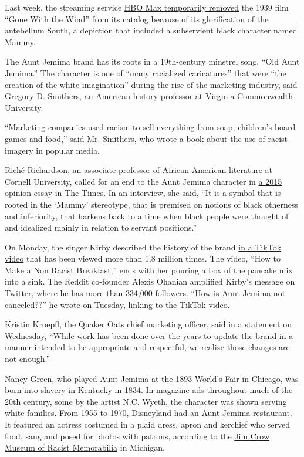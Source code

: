 Last week, the streaming service
\href{https://www.nytimes3xbfgragh.onion/2020/06/10/business/media/gone-with-the-wind-hbo-max.html}{HBO
Max temporarily removed} the 1939 film ``Gone With the Wind'' from its
catalog because of its glorification of the antebellum South, a
depiction that included a subservient black character named Mammy.

The Aunt Jemima brand has its roots in a 19th-century minstrel song,
``Old Aunt Jemima.'' The character is one of ``many racialized
caricatures'' that were ``the creation of the white imagination'' during
the rise of the marketing industry, said Gregory D. Smithers, an
American history professor at Virginia Commonwealth University.

``Marketing companies used racism to sell everything from soap,
children's board games and food,'' said Mr. Smithers, who wrote a book
about the use of racist imagery in popular media.

Riché Richardson, an associate professor of African-American literature
at Cornell University, called for an end to the Aunt Jemima character in
\href{https://www.nytimes3xbfgragh.onion/roomfordebate/2015/06/24/besides-the-confederate-flag-what-other-symbols-should-go/can-we-please-finally-get-rid-of-aunt-jemima}{a
2015 opinion} essay in The Times. In an interview, she said, ``It is a
symbol that is rooted in the `Mammy' stereotype, that is premised on
notions of black otherness and inferiority, that harkens back to a time
when black people were thought of and idealized mainly in relation to
servant positions.''

On Monday, the singer Kirby described the history of the brand
\href{https://www.tiktok.com/@singkirbysing/video/6838642500052274438}{in
a TikTok video} that has been viewed more than 1.8 million times. The
video, ``How to Make a Non Racist Breakfast,'' ends with her pouring a
box of the pancake mix into a sink. The Reddit co-founder Alexis Ohanian
amplified Kirby's message on Twitter, where he has more than 334,000
followers. ``How is Aunt Jemima not canceled??''
\href{https://twitter.com/alexisohanian/status/1273071420017385473?s=20}{he
wrote} on Tuesday, linking to the TikTok video.

Kristin Kroepfl, the Quaker Oats chief marketing officer, said in a
statement on Wednesday, ``While work has been done over the years to
update the brand in a manner intended to be appropriate and respectful,
we realize those changes are not enough.''

Nancy Green, who played Aunt Jemima at the 1893 World's Fair in Chicago,
was born into slavery in Kentucky in 1834. In magazine ads throughout
much of the 20th century, some by the artist N.C. Wyeth, the character
was shown serving white families. From 1955 to 1970, Disneyland had an
Aunt Jemima restaurant. It featured an actress costumed in a plaid
dress, apron and kerchief who served food, sang and posed for photos
with patrons, according to the
\href{https://www.ferris.edu/HTMLS/news/jimcrow/question/2019/april_may.htm\#}{Jim
Crow Museum of Racist Memorabilia} in Michigan.

